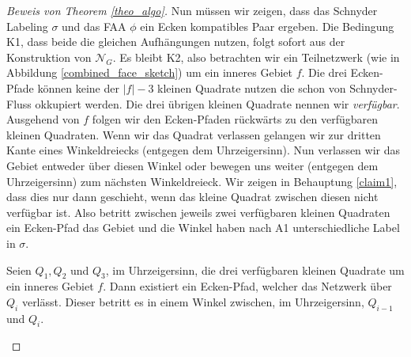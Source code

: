 \begin{proof}[Beweis von Theorem \ref{theo_algo}]
Nun müssen wir zeigen, dass das Schnyder Labeling $\sigma$ und das FAA $\phi$ ein Ecken kompatibles Paar ergeben. Die Bedingung K1, dass beide die gleichen Aufhängungen nutzen, folgt sofort aus der Konstruktion von $\mathcal{N}_G$. Es bleibt K2, also betrachten wir ein Teilnetzwerk (wie in Abbildung \ref{combined_face_sketch}) um ein inneres Gebiet $f$. Die drei Ecken-Pfade können keine der $|f|-3$ kleinen Quadrate nutzen die schon von Schnyder-Fluss okkupiert werden. Die drei übrigen kleinen Quadrate nennen wir \textit{verfügbar}. Ausgehend von $f$ folgen wir den Ecken-Pfaden rückwärts zu den verfügbaren kleinen Quadraten. Wenn wir das Quadrat verlassen gelangen wir zur dritten Kante eines Winkeldreiecks (entgegen dem Uhrzeigersinn). Nun verlassen wir das Gebiet entweder über diesen Winkel oder bewegen uns weiter (entgegen dem Uhrzeigersinn) zum nächsten Winkeldreieck. Wir zeigen in Behauptung \ref{claim1}, dass dies nur dann geschieht, wenn das kleine Quadrat zwischen diesen nicht verfügbar ist. Also betritt zwischen jeweils zwei verfügbaren kleinen Quadraten ein Ecken-Pfad das Gebiet und die Winkel haben nach A1 unterschiedliche Label in $\sigma$.

\begin{claim}\label{claim1}
Seien $Q_1,Q_2$ und $Q_3$, im Uhrzeigersinn, die drei verfügbaren kleinen Quadrate um ein inneres Gebiet $f$. Dann existiert ein Ecken-Pfad, welcher das Netzwerk über $Q_i$ verlässt. Dieser betritt es in einem Winkel zwischen, im Uhrzeigersinn, $Q_{i-1}$ und $Q_i$.
\end{claim}


\end{proof}
